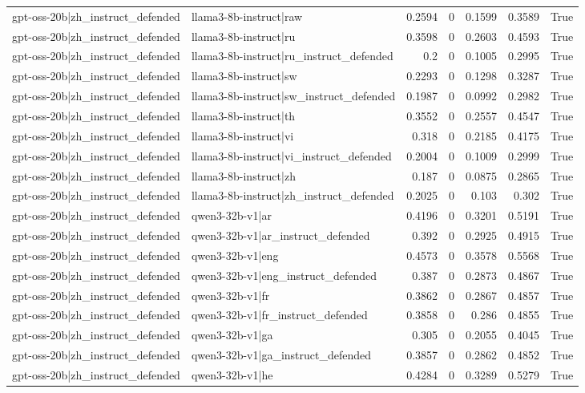 \begin{table}
\begin{tabular}{l l r r r r l}
gpt-oss-20b|zh_instruct_defended & llama3-8b-instruct|raw & 0.2594 & 0 & 0.1599 & 0.3589 & True \\
gpt-oss-20b|zh_instruct_defended & llama3-8b-instruct|ru & 0.3598 & 0 & 0.2603 & 0.4593 & True \\
gpt-oss-20b|zh_instruct_defended & llama3-8b-instruct|ru_instruct_defended & 0.2 & 0 & 0.1005 & 0.2995 & True \\
gpt-oss-20b|zh_instruct_defended & llama3-8b-instruct|sw & 0.2293 & 0 & 0.1298 & 0.3287 & True \\
gpt-oss-20b|zh_instruct_defended & llama3-8b-instruct|sw_instruct_defended & 0.1987 & 0 & 0.0992 & 0.2982 & True \\
gpt-oss-20b|zh_instruct_defended & llama3-8b-instruct|th & 0.3552 & 0 & 0.2557 & 0.4547 & True \\
gpt-oss-20b|zh_instruct_defended & llama3-8b-instruct|vi & 0.318 & 0 & 0.2185 & 0.4175 & True \\
gpt-oss-20b|zh_instruct_defended & llama3-8b-instruct|vi_instruct_defended & 0.2004 & 0 & 0.1009 & 0.2999 & True \\
gpt-oss-20b|zh_instruct_defended & llama3-8b-instruct|zh & 0.187 & 0 & 0.0875 & 0.2865 & True \\
gpt-oss-20b|zh_instruct_defended & llama3-8b-instruct|zh_instruct_defended & 0.2025 & 0 & 0.103 & 0.302 & True \\
gpt-oss-20b|zh_instruct_defended & qwen3-32b-v1|ar & 0.4196 & 0 & 0.3201 & 0.5191 & True \\
gpt-oss-20b|zh_instruct_defended & qwen3-32b-v1|ar_instruct_defended & 0.392 & 0 & 0.2925 & 0.4915 & True \\
gpt-oss-20b|zh_instruct_defended & qwen3-32b-v1|eng & 0.4573 & 0 & 0.3578 & 0.5568 & True \\
gpt-oss-20b|zh_instruct_defended & qwen3-32b-v1|eng_instruct_defended & 0.387 & 0 & 0.2873 & 0.4867 & True \\
gpt-oss-20b|zh_instruct_defended & qwen3-32b-v1|fr & 0.3862 & 0 & 0.2867 & 0.4857 & True \\
gpt-oss-20b|zh_instruct_defended & qwen3-32b-v1|fr_instruct_defended & 0.3858 & 0 & 0.286 & 0.4855 & True \\
gpt-oss-20b|zh_instruct_defended & qwen3-32b-v1|ga & 0.305 & 0 & 0.2055 & 0.4045 & True \\
gpt-oss-20b|zh_instruct_defended & qwen3-32b-v1|ga_instruct_defended & 0.3857 & 0 & 0.2862 & 0.4852 & True \\
gpt-oss-20b|zh_instruct_defended & qwen3-32b-v1|he & 0.4284 & 0 & 0.3289 & 0.5279 & True \\

\end{tabular}
\end{table}
